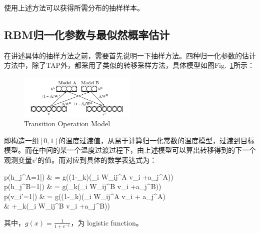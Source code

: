 \documentclass[journal,a4paper]{IEEEtran}
\begin{document}
	使用上述方法可以获得所需分布的抽样样本。

	\subsection{RBM归一化参数与最似然概率估计}

	在讲述具体的抽样方法之前，需要首先说明一下抽样方法。四种归一化参数的估计方法中，除了TAP外，都采用了类似的转移采样方法，具体模型如图Fig.~\ref{fig2}所示：
	\begin{figure}[h]
		\includegraphics[width = 0.5\textwidth]{2.jpg}
		\caption{Transition Operation Model}
		\label{fig2}
	\end{figure}
	即构造一组$[0,1]$的温度过渡值，从易于计算归一化常数的温度模型，过渡到目标模型。而在中间的某一个温度过渡过程下，由上述模型可以算出转移得到的下一个观测变量$v'$的值。而对应到具体的数学表达式为：
	\begin{flalign}
	p(h_j^A=1|) & = g\left((1-\beta_k)\left(\sum_i W_{ij}^A v_i +a_j^A\right)\right) \\
	\label{equ3}
	p(h_j^B=1|) & = g\left(\beta_k\left(\sum_i W_{ij}^B v_i +a_j^B\right)\right) \\
	\label{equ4}
	p(v_i'=1|) & = g((1-\beta_k)(\sum_i W_{ij}^A v_i + a_j^A) \\
	 & +\beta_k(\sum_i W_{ij}^B v_i +a_j^B))
    \label{equ5}
	\end{flalign}
	其中，$g(x)=\frac{1}{1+e^{-x}}$，为 logistic function。
\end{document}

